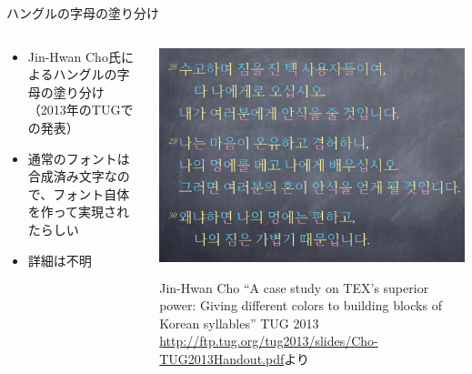 \documentclass[unicode,14pt]{beamer}
\begin{document}
\begin{frame}[t]{ハングルの字母の塗り分け}
  \sffamily
  \begin{columns}[t]
    \begin{column}{.5\textwidth}
  \begin{itemize}
\item Jin-Hwan Cho氏によるハングルの字母の塗り分け（2013年のTUGでの発表）
\item 通常のフォントは合成済み文字なので、フォント自体を作って実現されたらしい
\item 詳細は不明
  \end{itemize}
    \end{column}
    \begin{column}{.5\textwidth}
  \begin{center}
    \includegraphics[width=\textwidth]{figures/cho.png}
  \end{center}
  \raggedleft\tiny\color{50gray} Jin-Hwan Cho
``A case study on TEX’s superior power: Giving different colors to building blocks of Korean syllables'' TUG 2013
  \url{http://ftp.tug.org/tug2013/slides/Cho-TUG2013Handout.pdf}より
    \end{column}
  \end{columns}
\end{frame}
\end{document}
